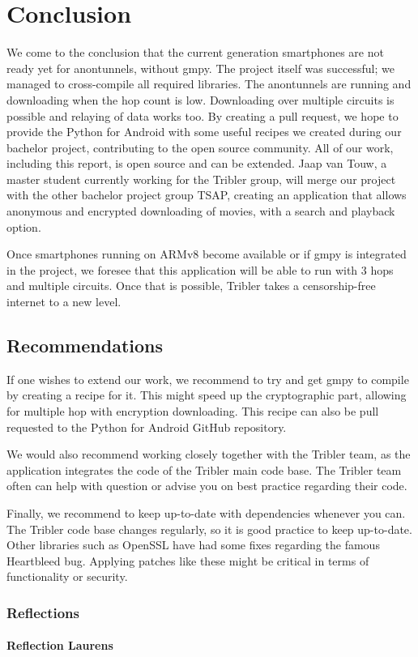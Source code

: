 \chapter{Conclusion}
	We come to the conclusion that the current generation smartphones are not ready yet for anontunnels, without gmpy. The project itself was successful; we managed to cross-compile all required libraries. The anontunnels are running and downloading when the hop count is low. Downloading over multiple circuits is possible and relaying of data works too. By creating a pull request, we hope to provide the Python for Android with some useful recipes we created during our bachelor project, contributing to the open source community. 
	All of our work, including this report, is open source and can be extended. Jaap van Touw, a master student currently working for the Tribler group, will merge our project with the other bachelor project group TSAP, creating an application that allows anonymous and encrypted downloading of movies, with a search and playback option.
	
	
	Once smartphones running on ARMv8 become available or if gmpy is integrated in the project, we foresee that this application will be able to run with 3 hops and multiple circuits. Once that is possible, Tribler takes a censorship-free internet to a new level.
	
	\section{Recommendations}
		If one wishes to extend our work, we recommend to try and get gmpy to compile by creating a recipe for it. This might speed up the cryptographic part, allowing for multiple hop with encryption downloading. This recipe can also be pull requested to the Python for Android GitHub repository.
		
		We would also recommend working closely together with the Tribler team, as the application integrates the code of the Tribler main code base. The Tribler team often can help with question or advise you on best practice regarding their code.
		
		Finally, we recommend to keep up-to-date with dependencies whenever you can. The Tribler code base changes regularly, so it is good practice to keep up-to-date. Other libraries such as OpenSSL have had some fixes regarding the famous Heartbleed bug. Applying patches like these might be critical in terms of functionality or security.
		
	\subsection{Reflections}
		
		\subsubsection{Reflection Laurens}
			